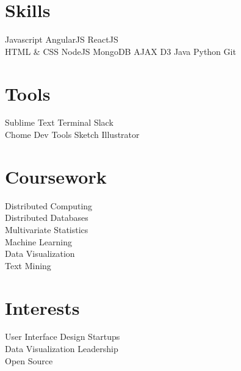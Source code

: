 \documentclass[]{deedy-resume-openfont}
\begin{document}
\begin{minipage}[t]{0.33\textwidth}

\section{Skills}
Javascript \textbullet{} AngularJS \textbullet{} ReactJS \textbullet{} \\ 
HTML \& CSS \textbullet{} NodeJS \textbullet{} MongoDB \textbullet{} AJAX \textbullet{} D3
\textbullet{} Java \textbullet{} Python \textbullet{} Git \\
\sectionsep


\section{Tools}
Sublime Text \textbullet{} Terminal \textbullet{} Slack \textbullet{} \\ 
Chome Dev Tools \textbullet{} Sketch \textbullet{} Illustrator
\sectionsep


\section{Coursework}
Distributed Computing \\
Distributed Databases \\
Multivariate Statistics \\
Machine Learning \\
Data Visualization \\
Text Mining \\
\sectionsep



\section{Interests}
User Interface \textbullet{} Design \textbullet{} Startups \textbullet{} \\
Data Visualization \textbullet{} Leadership \\
Open Source \textbullet{} 
\sectionsep

%
%

\end{minipage} 
\end{document}
